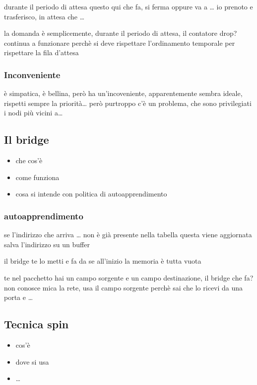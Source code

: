 \documentclass[11pt]{article}
\begin{document}
durante il periodo di attesa questo qui che fa, si ferma oppure va a \ldots{}   
io prenoto e trasferisco, in attesa che \ldots{}

la domanda è semplicemente, durante il periodo di attesa, il contatore drop?
continua a funzionare perchè si deve rispettare l'ordinamento temporale per rispettare la fila d'attesa

\subsubsection{Inconveniente}
\label{sec:org3f6c7af}
è simpatica, è bellina, però ha un'incoveniente, apparentemente sembra ideale, rispetti sempre la priorità\ldots{}
però purtroppo c'è un problema, che sono privilegiati i nodi più vicini a\ldots{}

\subsection{Il bridge}
\label{sec:org7c59af0}
\begin{itemize}
\item che cos'è
\item come funziona
\item cosa si intende con politica di autoapprendimento
\end{itemize}

\subsubsection{autoapprendimento}
\label{sec:org88cdd48}
se l'indirizzo che arriva \ldots{} non è già presente nella tabella questa viene aggiornata
salva l'indirizzo su un buffer

il bridge te lo metti e fa da se
all'inizio la memoria è tutta vuota

te nel pacchetto hai un campo sorgente e un campo destinazione, il bridge che fa? non conosce mica la rete, usa il campo sorgente perchè sai che lo ricevi da una porta e \ldots{}

\subsection{Tecnica spin}
\label{sec:org652bd92}
\begin{itemize}
\item cos'è
\item dove si usa
\item \ldots{}
\end{itemize}
\end{document}
